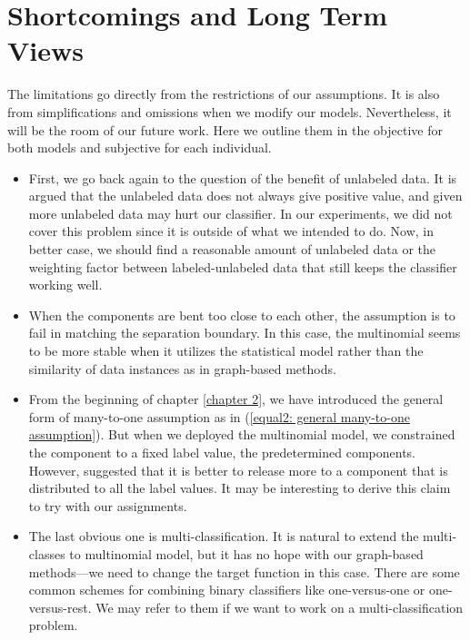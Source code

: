 \section{Shortcomings and Long Term Views}
The limitations go directly from the restrictions of our assumptions. It is also from simplifications and omissions when we modify our models. Nevertheless, it will be the room of our future work. Here we outline them in the objective for both models and subjective for each individual.

\begin{itemize}
	\item First, we go back again to the question of the benefit of unlabeled data. It is argued that the unlabeled data does not always give positive value, and given more unlabeled data may hurt our classifier. In our experiments, we did not cover this problem since it is outside of what we intended to do. Now, in better case, we should find a reasonable amount of unlabeled data or the weighting factor between labeled-unlabeled data that still keeps the classifier working well.
	
 	\item When the components are bent too close to each other, the assumption is to fail in matching the separation boundary. In this case, the multinomial seems to be more stable when it utilizes the statistical model rather than the similarity of data instances as in graph-based methods.
	
	\item From the beginning of chapter \ref{chapter 2}, we have introduced the general form of many-to-one assumption as in (\ref{equal2: general many-to-one assumption}). But when we deployed the multinomial model, we constrained the component to a fixed label value, the predetermined components. However, \citeauthor{NIPS1996_1208} \parencite{NIPS1996_1208} suggested that it is better to release more to a component that is distributed to all the label values. It may be interesting to derive this claim to try with our assignments.
	
	\item The last obvious one is multi-classification. It is natural to extend the multi-classes to multinomial model, but it has no hope with our graph-based methods---we need to change the target function in this case. There are some common schemes for combining binary classifiers like one-versus-one or one-versus-rest. We may refer to them if we want to work on a multi-classification problem.
\end{itemize}

